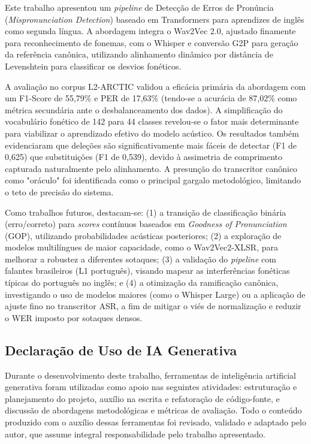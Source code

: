 \documentclass[12pt]{article}
\begin{document}
Este trabalho apresentou um \textit{pipeline} de Detecção de Erros de Pronúncia (\textit{Mispronunciation Detection}) baseado em Transformers para aprendizes de inglês como segunda língua. A abordagem integra o Wav2Vec 2.0, ajustado finamente para reconhecimento de fonemas, com o Whisper e conversão G2P para geração da referência canônica, utilizando alinhamento dinâmico por distância de Levenshtein para classificar os desvios fonéticos.

A avaliação no corpus L2-ARCTIC validou a eficácia primária da abordagem com um F1-Score de 55,79\% e PER de 17,63\% (tendo-se a acurácia de 87,02\% como métrica secundária ante o desbalanceamento dos dados). A simplificação do vocabulário fonético de 142 para 44 classes revelou-se o fator mais determinante para viabilizar o aprendizado efetivo do modelo acústico. Os resultados também evidenciaram que deleções são significativamente mais fáceis de detectar (F1 de 0,625) que substituições (F1 de 0,539), devido à assimetria de comprimento capturada naturalmente pelo alinhamento. A presunção do transcritor canônico como "oráculo" foi identificada como o principal gargalo metodológico, limitando o teto de precisão do sistema.

Como trabalhos futuros, destacam-se: (1) a transição de classificação binária (erro/correto) para \textit{scores} contínuos baseados em \textit{Goodness of Pronunciation} (GOP), utilizando probabilidades acústicas posteriores; (2) a exploração de modelos multilíngues de maior capacidade, como o Wav2Vec2-XLSR, para melhorar a robustez a diferentes sotaques; (3) a validação do \textit{pipeline} com falantes brasileiros (L1 português), visando mapear as interferências fonéticas típicas do português no inglês; e (4) a otimização da ramificação canônica, investigando o uso de modelos maiores (como o Whisper Large) ou a aplicação de ajuste fino no transcritor ASR, a fim de mitigar o viés de normalização e reduzir o WER imposto por sotaques densos.

\subsection*{Declaração de Uso de IA Generativa}

Durante o desenvolvimento deste trabalho, ferramentas de inteligência artificial generativa foram utilizadas como apoio nas seguintes atividades: estruturação e planejamento do projeto, auxílio na escrita e refatoração de código-fonte, e discussão de abordagens metodológicas e métricas de avaliação. Todo o conteúdo produzido com o auxílio dessas ferramentas foi revisado, validado e adaptado pelo autor, que assume integral responsabilidade pelo trabalho apresentado.
\end{document}
